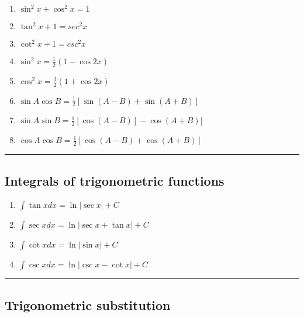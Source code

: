 \documentclass[
  landscape,  
  10pt,
]{article}
\begin{document}
\begin{multicols}{3}
\begin{enumerate}
\def\labelenumi{\arabic{enumi}.}
\item
  \(\displaystyle \sin^2 x + \cos^2 x = 1\)
\item
  \(\displaystyle \tan^2 x + 1 = sec^2 x\)
\item
  \(\displaystyle \cot^2 x + 1 = csc^2 x\)
\item
  \(\displaystyle \sin^2 x = \frac{1}{2}(1-\cos 2x)\)
\item
  \(\displaystyle \cos^2 x = \frac{1}{2}(1+\cos 2x)\)
\item
  \(\displaystyle \sin A\cos B = \frac{1}{2}[\sin(A-B)+\sin(A+B)]\)
\item
  \(\displaystyle \sin A\sin B = \frac{1}{2}[\cos(A-B) ]- \cos(A+B)]\)
\item
  \(\displaystyle \cos A\cos B = \frac{1}{2} \left[ \cos(A-B)+\cos(A+B) \right]\)
\end{enumerate}

\begin{center}\rule{0.5\linewidth}{0.5pt}\end{center}

\hypertarget{integrals-of-trigonometric-functions}{%
\subsection{Integrals of trigonometric
functions}\label{integrals-of-trigonometric-functions}}

\begin{enumerate}
\def\labelenumi{\arabic{enumi}.}
\item
  \(\displaystyle \int \tan x dx = \ln |\sec x| +C\)
\item
  \(\displaystyle \int \sec x dx = \ln|\sec x + \tan x| + C\)
\item
  \(\displaystyle \int \cot x dx = \ln|\sin x| + C\)
\item
  \(\displaystyle \int \csc x dx = \ln|\csc x - \cot x| + C\)
\end{enumerate}

\begin{center}\rule{0.5\linewidth}{0.5pt}\end{center}

\end{multicols}

\onecolumn

\hypertarget{trigonometric-substitution}{%
\subsection{Trigonometric
substitution}\label{trigonometric-substitution}}
\end{document}
